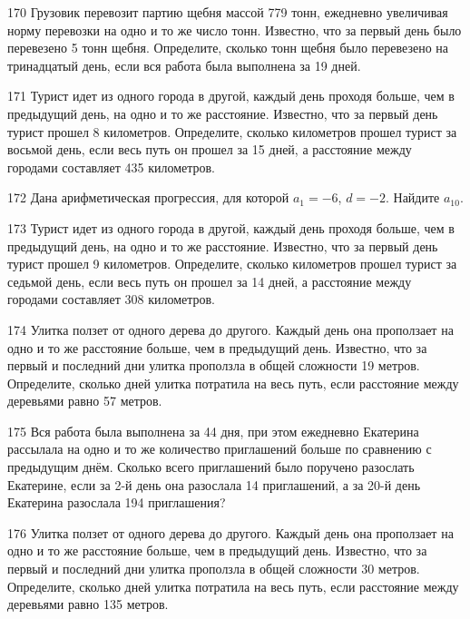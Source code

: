 \documentclass[4apaper]{article}
\begin{document}
\begin{taskBN}{170}
Грузовик перевозит партию щебня массой 779 тонн, ежедневно увеличивая норму перевозки на одно и то же число тонн. Известно, что за первый день было перевезено 5 тонн щебня. Определите, сколько тонн щебня было перевезено на тринадцатый день, если вся работа была выполнена за 19 дней.
\end{taskBN}

\begin{taskBN}{171}
Турист идет из одного города в другой, каждый день проходя больше, чем в предыдущий день, на одно и то же расстояние. Известно, что за первый день турист прошел 8 километров. Определите, сколько километров прошел турист за восьмой день, если весь путь он прошел за 15 дней, а расстояние между городами составляет 435 километров.
\end{taskBN}

\begin{taskBN}{172}
Дана арифметическая прогрессия, для которой $a_1 = -6$, $d=-2$. Найдите $a_{10}$.
\end{taskBN}

\begin{taskBN}{173}
Турист идет из одного города в другой, каждый день проходя больше, чем в предыдущий день, на одно и то же расстояние. Известно, что за первый день турист прошел 9 километров. Определите, сколько километров прошел турист за седьмой день, если весь путь он прошел за 14 дней, а расстояние между городами составляет 308 километров.
\end{taskBN}

\begin{taskBN}{174}
 Улитка ползет от одного дерева до другого. Каждый день она проползает на одно и то же расстояние больше, чем в предыдущий день. Известно, что за первый и последний дни улитка проползла в общей сложности 19 метров. Определите, сколько дней улитка потратила на весь путь, если расстояние между деревьями равно 57 метров.
\end{taskBN}

\begin{taskBN}{175}
Вся работа была выполнена за 44 дня, при этом ежедневно Екатерина рассылала на одно и то же количество приглашений больше по сравнению с предыдущим днём. Сколько всего приглашений было поручено разослать Екатерине, если за 2-й день она разослала 14 приглашений, а за 20-й день Екатерина разослала 194 приглашения? 
\end{taskBN}

\begin{taskBN}{176}
 Улитка ползет от одного дерева до другого. Каждый день она проползает на одно и то же расстояние больше, чем в предыдущий день. Известно, что за первый и последний дни улитка проползла в общей сложности 30 метров. Определите, сколько дней улитка потратила на весь путь, если расстояние между деревьями равно 135 метров.
\end{taskBN}
\end{document}
